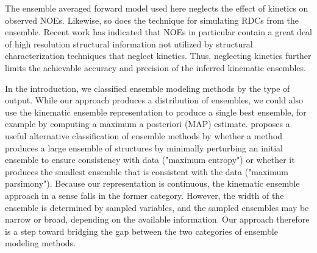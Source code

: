\documentclass[../../main.tex]{subfiles}
\begin{document}
\begin{refsection}
	The ensemble averaged forward model used here neglects the effect of kinetics on observed NOEs.
	Likewise, so does the technique for simulating RDCs from the ensemble.
	Recent work has indicated that NOEs in particular contain a great deal of high resolution structural information not utilized by structural characterization techniques that neglect kinetics\supercite{smithEnhancingNMRDerived2020}.
	Thus, neglecting kinetics further limits the achievable accuracy and precision of the inferred kinematic ensembles.


	In the introduction, we classified ensemble modeling methods by the type of output.
	While our approach produces a distribution of ensembles, we could also use the kinematic ensemble representation to produce a single best ensemble, for example by computing a maximum a posteriori (MAP) estimate.
	\cite{bonomiPrinciplesProteinStructural2017} proposes a useful alternative classification of ensemble methods by whether a method produces a large ensemble of structures by minimally perturbing an initial ensemble to ensure consistency with data ("maximum entropy") or whether it produces the smallest ensemble that is consistent with the data ("maximum parsimony").
	Because our representation is continuous, the kinematic ensemble approach in a sense falls in the former category.
	However, the width of the ensemble is determined by sampled variables, and the sampled ensembles may be narrow or broad, depending on the available information.
	Our approach therefore is a step toward bridging the gap between the two categories of ensemble modeling methods.



\end{refsection}
\end{document}
